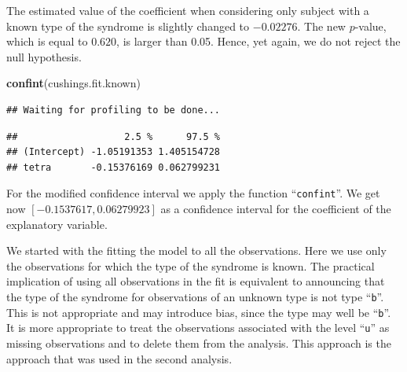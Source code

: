 \documentclass[]{krantz}
\makeatletter
\newenvironment{Shaded}{\begin{snugshade}}{\end{snugshade}}
\newcommand{\KeywordTok}[1]{\textcolor[rgb]{0.13,0.29,0.53}{\textbf{#1}}}
\newcommand{\NormalTok}[1]{#1}
\newenvironment{kframe}{%
\medskip{}
\setlength{\fboxsep}{.8em}
 \def\at@end@of@kframe{}%
 \ifinner\ifhmode%
  \def\at@end@of@kframe{\end{minipage}}%
  \begin{minipage}{\columnwidth}%
 \fi\fi%
 \def\FrameCommand##1{\hskip\@totalleftmargin \hskip-\fboxsep
 \colorbox{shadecolor}{##1}\hskip-\fboxsep
     \hskip-\linewidth \hskip-\@totalleftmargin \hskip\columnwidth}%
 \MakeFramed {\advance\hsize-\width
   \@totalleftmargin\z@ \linewidth\hsize
   \@setminipage}}%
 {\par\unskip\endMakeFramed%
 \at@end@of@kframe}
\renewenvironment{Shaded}{\begin{kframe}}{\end{kframe}}
\theoremstyle{definition}
\theoremstyle{definition}
\theoremstyle{definition}
\theoremstyle{remark}
\makeatother
\begin{document}
\begin{enumerate}
  The estimated value of the coefficient when considering only subject
  with a known type of the syndrome is slightly changed to \(-0.02276\).
  The new \(p\)-value, which is equal to \(0.620\), is larger than 0.05.
  Hence, yet again, we do not reject the null hypothesis.

\begin{Shaded}
\begin{Highlighting}[]
\KeywordTok{confint}\NormalTok{(cushings.fit.known)}
\end{Highlighting}
\end{Shaded}

\begin{verbatim}
## Waiting for profiling to be done...
\end{verbatim}

\begin{verbatim}
##                   2.5 %      97.5 %
## (Intercept) -1.05191353 1.405154728
## tetra       -0.15376169 0.062799231
\end{verbatim}

  For the modified confidence interval we apply the function
  ``\texttt{confint}''. We get now \([-0.1537617, 0.06279923]\) as a
  confidence interval for the coefficient of the explanatory variable.

  We started with the fitting the model to all the observations. Here we
  use only the observations for which the type of the syndrome is known.
  The practical implication of using all observations in the fit is
  equivalent to announcing that the type of the syndrome for
  observations of an unknown type is not type ``\texttt{b}''. This is
  not appropriate and may introduce bias, since the type may well be
  ``\texttt{b}''. It is more appropriate to treat the observations
  associated with the level ``\texttt{u}'' as missing observations and
  to delete them from the analysis. This approach is the approach that
  was used in the second analysis.
\end{enumerate}



\backmatter
\printindex
\end{document}
